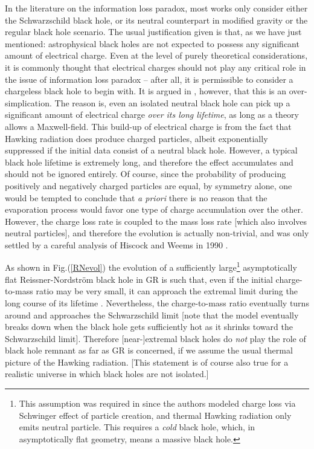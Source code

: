 \documentclass[12pt]{article}
\newcommand{\2}{$^2$}
\newcommand{\3}{$^3$}
\newcommand{\4}{$_4$}
\newcommand{\5}{$_5$}
\begin{document}
In the literature on the information loss paradox, most works only consider either the Schwarzschild black hole, or its neutral counterpart in modified gravity or the regular black hole scenario. The usual justification given is that, as we have just mentioned: astrophysical black holes are not expected to possess any significant amount of electrical charge. Even at the level of purely theoretical considerations, it is commonly thought that electrical charges should not play any critical role in the issue of information loss paradox -- after all, it is permissible to consider a chargeless black hole to begin with. It is argued in \cite{OMC, OC}, however, that this is an over-simplication. The reason is, even an isolated neutral black hole can pick up a significant amount of electrical charge \emph{over its long lifetime}, as long as a theory allows a Maxwell-field. This build-up of electrical charge is from the fact that Hawking radiation does produce charged particles, albeit exponentially suppressed if the initial data consist of a neutral black hole. However, a typical black hole lifetime is extremely long, and therefore the effect accumulates and should not be ignored entirely. Of course, since the probability of producing positively and negatively charged particles are equal, by symmetry alone, one would be tempted to conclude that \emph{a priori} there is no reason that the evaporation process would favor one type of charge accumulation over the other. However, the charge loss rate is coupled to the mass loss rate [which also involves neutral particles], and therefore the evolution is actually non-trivial, and was only settled by a careful analysis of Hiscock and Weems in 1990 \cite{kn:HW}.

As shown in Fig.(\ref{RNevol}) the evolution of a sufficiently large\footnote{This assumption was required in \cite{kn:HW} since the authors modeled charge loss via Schwinger effect of particle creation, and thermal Hawking radiation only emits neutral particle. This requires a \emph{cold} black hole, which, in asymptotically flat geometry, means a massive black hole.} asymptotically flat Reissner-Nordstr\"om black hole in GR is such that, even if the initial charge-to-mass ratio may be very small, it can approach the extremal limit during the long course of its lifetime \cite{kn:HW, kn:SP}. Nevertheless, the charge-to-mass ratio eventually turns around and approaches the Schwarzschild limit [note that the model eventually breaks down when the black hole gets sufficiently hot as it shrinks toward the Schwarzschild limit]. Therefore [near-]extremal black holes do \emph{not} play the role of black hole remnant as far as GR is concerned, if we assume the usual thermal picture of the Hawking radiation. [This statement is of course also true for a realistic universe in which black holes are not isolated.]
\end{document}
